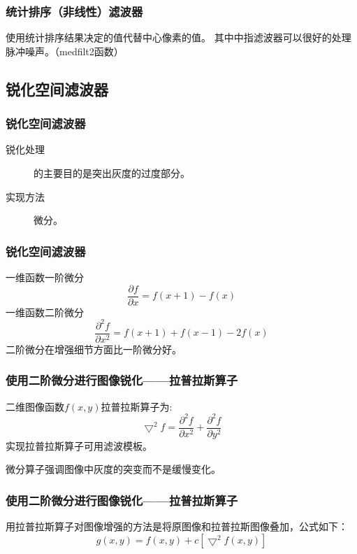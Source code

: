 \documentclass[notheorems,serif,table,compress]{beamer}  %
\begin{document}
\begin{frame}
\frametitle{统计排序（非线性）滤波器}
 使用统计排序结果决定的值代替中心像素的值。
 其中中指滤波器可以很好的处理脉冲噪声。（medfilt2函数）
 \end{frame}

\subsection{锐化空间滤波器}
\begin{frame}
\frametitle{锐化空间滤波器}
 \begin{description}
 \item [锐化处理]的主要目的是突出灰度的过度部分。
 \item [实现方法]微分。
 \end{description}
 
 \end{frame}

\begin{frame}
\frametitle{锐化空间滤波器}
 一维函数一阶微分
\begin{equation}
 \frac{\partial f}{\partial x}=f(x+1)-f(x)
\end{equation}
 一维函数二阶微分
\begin{equation}
 \frac{\partial^{2}f}{\partial x^{2}}=f(x+1)+f(x-1)-2f(x)
\end{equation}
 二阶微分在增强细节方面比一阶微分好。
 \end{frame}

\begin{frame}
\frametitle{使用二阶微分进行图像锐化——拉普拉斯算子}
 二维图像函数$f(x,y)$拉普拉斯算子为:
\begin{equation}
\bigtriangledown^{2}f= \frac{\partial^{2}f}{\partial x^{2}}+\frac{\partial^{2}f}{\partial y^{2}}
\end{equation}
实现拉普拉斯算子可用滤波模板。

微分算子强调图像中灰度的突变而不是缓慢变化。
 \end{frame}

\begin{frame}
\frametitle{使用二阶微分进行图像锐化——拉普拉斯算子}
 用拉普拉斯算子对图像增强的方法是将原图像和拉普拉斯图像叠加，公式如下：
\begin{equation}
g(x,y)=f(x,y)+c[\bigtriangledown^{2}f(x,y)]
\end{equation}
 \end{frame}




\end{document}
